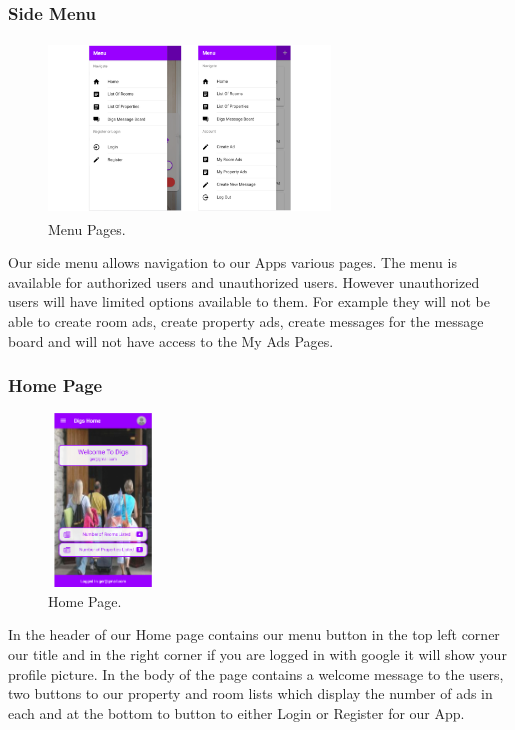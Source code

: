 \subsubsection{Side Menu}

\begin{figure}[h]
\centering
\includegraphics[width=7.5cm, height=4.6cm]{img/Menu}
\caption{Menu Pages.}
\end{figure}

Our side menu allows navigation to our Apps various pages. The menu is available for authorized users and unauthorized users. However unauthorized users will have limited options available to them. For example they will not be able to create room ads, create property ads, create messages for the message board and will not have access to the My Ads Pages.

\subsubsection{Home Page}

\begin{figure}[h]
\centering
\includegraphics[width=2.9cm, height=4.6cm]{img/Home}
\caption{Home Page.}
\end{figure}

In the header of our Home page contains our menu button in the top left corner our title and in the right corner if you are logged in with google it will show your profile picture. In the body of the page contains a welcome message to the users, two buttons to our property and room lists which display the number of ads in each and at the bottom to button to either Login or Register for our App.

